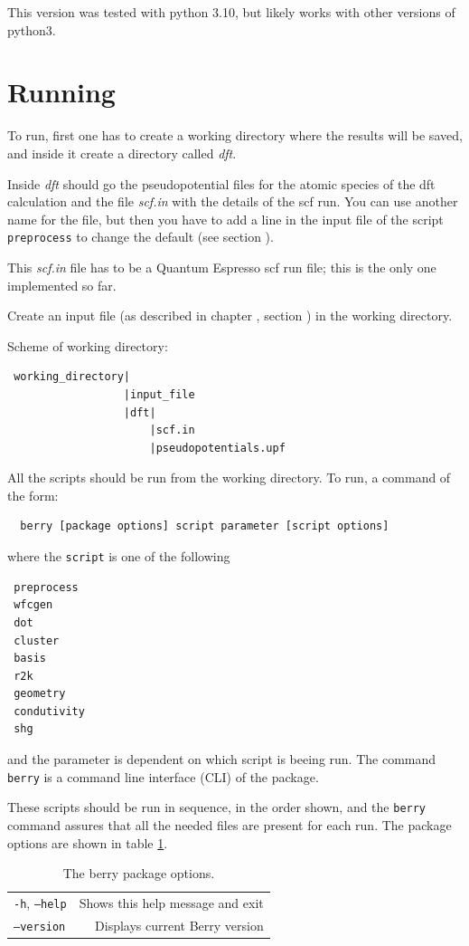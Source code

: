 \documentclass[a4paper,12pt]{report}
\begin{document}
This version was tested with python 3.10, but likely works with other versions of python3.


\section{Running}\label{sec:running}

 To run, first one has to create a working directory where the results will be saved,
 and inside it create a directory called \emph{dft}.

 Inside \emph{dft} should go the pseudopotential files for the atomic species of the dft calculation
and the file \emph{scf.in} with the details of the scf run.
You can use another name for the file, but then you have to add a line in the input file of
the script \texttt{preprocess} to change the default (see section ).


 This \emph{scf.in} file has to be a {\sc Quantum Espresso} scf run file;
 this is the only one implemented so far.

 Create an input file (as described in chapter , section )
 in the working directory.


Scheme of working directory:
\begin{verbatim}
 working_directory|
                  |input_file
                  |dft|
                      |scf.in
                      |pseudopotentials.upf
\end{verbatim}
\bigskip

 All the scripts should be run from the working directory.
 To run, a command of the form:
 \begin{verbatim}
  berry [package options] script parameter [script options]
 \end{verbatim}
where the \texttt{script} is one of the following
\begin{verbatim}
 preprocess
 wfcgen
 dot
 cluster
 basis
 r2k
 geometry
 condutivity
 shg
\end{verbatim}
and the parameter is dependent on which script is beeing run.
The command \texttt{berry} is a command line interface (CLI) of the package.

These scripts should be run in sequence, in the order shown, and the \texttt{berry} command assures
that all the needed files are present for each run.
The package options are shown in table \ref{tab:package_options}.

\begin{table}[h]
 \centering
 \caption{The berry package options.}\label{tab:package_options}
\begin{tabular}[]{lr}
\hline
  \texttt{-h}, \texttt{--help}     &    Shows this help message and exit \\
  \texttt{--version}               &    Displays current Berry version \\
\hline
\end{tabular}
\bigskip
\end{table}
\end{document}
